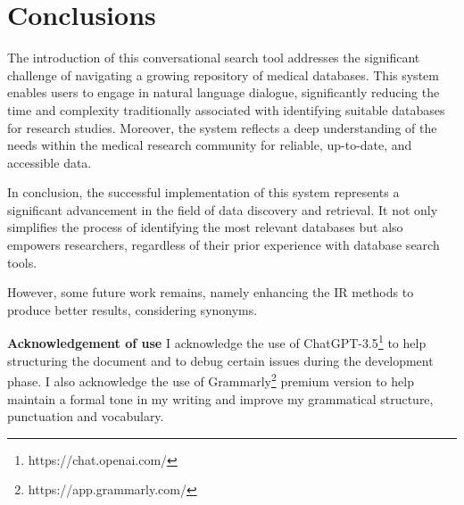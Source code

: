 \chapter{Conclusions}
\label{chapter:Conclusions}


The introduction of this conversational search tool addresses the significant challenge of navigating a growing repository of medical databases. This system enables users to engage in natural language dialogue, significantly reducing the time and complexity traditionally associated with identifying suitable databases for research studies. Moreover, the system reflects a deep understanding of the needs within the medical research community for reliable, up-to-date, and accessible data.


In conclusion, the successful implementation of this system represents a significant advancement in the field of data discovery and retrieval. It not only simplifies the process of identifying the most relevant databases but also empowers researchers, regardless of their prior experience with database search tools. 


However, some future work remains, namely enhancing the IR methods to produce better results, considering synonyms.
% 



\hspace{1cm}


\noindent \textbf{Acknowledgement of use}
\small
I acknowledge the use of ChatGPT-3.5\footnote{https://chat.openai.com/} to help structuring the document and to debug certain issues during the development phase. I also acknowledge the use of Grammarly\footnote{https://app.grammarly.com/} premium version to help maintain a formal tone in my writing and improve my grammatical structure, punctuation and vocabulary.

